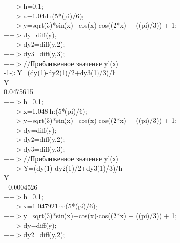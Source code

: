 \documentclass[russian,utf8,nocolumnxxxi,nocolumnxxxii]{eskdtext}
\begin{document}
$-->$h=0.1;\\

$-->$x=1.04:h:(5*(pi)/6);\\

$-->$y=sqrt(3)*sin(x)+cos(x)-cos((2*x) + ((pi)/3)) + 1;\\

$-->$dy=diff(y);\\

$-->$dy2=diff(y,2);\\

$-->$dy3=diff(y,3);\\

$-->//$Приближенное значение y’(х)\\

-1->Y=(dy(1)-dy2(1)/2+dy3(1)/3)/h\\
 Y  =\\

    0.0475615\\

$-->$h=0.1;\\

$-->$x=1.048:h:(5*(pi)/6);\\

$-->$y=sqrt(3)*sin(x)+cos(x)-cos((2*x) + ((pi)/3)) + 1;\\

$-->$dy=diff(y);\\

$-->$dy2=diff(y,2);\\

$-->$dy3=diff(y,3);\\

$-->//$Приближенное значение y’(х)\\

$-->$Y=(dy(1)-dy2(1)/2+dy3(1)/3)/h\\
 Y  =\\

  - 0.0004526\\

$-->$h=0.1;\\

$-->$x=1.047921:h:(5*(pi)/6);\\

$-->$y=sqrt(3)*sin(x)+cos(x)-cos((2*x) + ((pi)/3)) + 1;\\

$-->$dy=diff(y);\\

$-->$dy2=diff(y,2);\\
\end{document}
